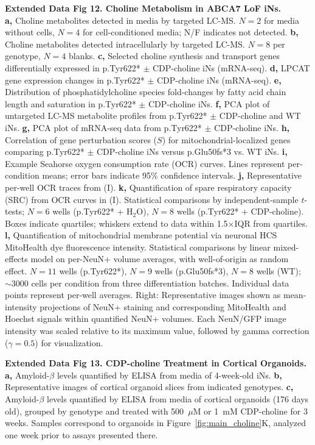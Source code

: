 \textbf{Extended Data Fig 12. Choline Metabolism in ABCA7 LoF iNs.}\\
\textbf{a,} Choline metabolites detected in media by targeted LC-MS. $N=2$ for media without cells, $N=4$ for cell-conditioned media; N/F indicates not detected.
\textbf{b,} Choline metabolites detected intracellularly by targeted LC-MS. $N=8$ per genotype, $N=4$ blanks.
\textbf{c,} Selected choline synthesis and transport genes differentially expressed in p.Tyr622* $\pm$ CDP-choline iNs (mRNA-seq).
\textbf{d,} LPCAT gene expression changes in p.Tyr622* $\pm$ CDP-choline iNs (mRNA-seq).
\textbf{e,} Distribution of phosphatidylcholine species fold-changes by fatty acid chain length and saturation in p.Tyr622* $\pm$ CDP-choline iNs.
\textbf{f,} PCA plot of untargeted LC-MS metabolite profiles from p.Tyr622* $\pm$ CDP-choline and WT iNs.
\textbf{g,} PCA plot of mRNA-seq data from p.Tyr622* $\pm$ CDP-choline iNs.
\textbf{h,} Correlation of gene perturbation scores ($S$) for mitochondrial-localized genes comparing p.Tyr622* $\pm$ CDP-choline iNs versus p.Glu50fs*3 vs. WT iNs.
\textbf{i,} Example Seahorse oxygen consumption rate (OCR) curves. Lines represent per-condition means; error bars indicate 95\% confidence intervals.
\textbf{j,} Representative per-well OCR traces from (I).
\textbf{k,} Quantification of spare respiratory capacity (SRC) from OCR curves in (I). Statistical comparisons by independent-sample $t$-tests; $N=6$ wells (p.Tyr622* + H$_2$O), $N=8$ wells (p.Tyr622* + CDP-choline). Boxes indicate quartiles; whiskers extend to data within 1.5$\times$IQR from quartiles.
\textbf{l,} Quantification of mitochondrial membrane potential via neuronal HCS MitoHealth dye fluorescence intensity. Statistical comparisons by linear mixed-effects model on per-NeuN+ volume averages, with well-of-origin as random effect. $N=11$ wells (p.Tyr622*), $N=9$ wells (p.Glu50fs*3), $N=8$ wells (WT); $\sim3000$ cells per condition from three differentiation batches. Individual data points represent per-well averages. Right: Representative images shown as mean-intensity projections of NeuN+ staining and corresponding MitoHealth and Hoechst signals within quantified NeuN+ volumes. Each NeuN/GFP image intensity was scaled relative to its maximum value, followed by gamma correction ($\gamma = 0.5$) for visualization.

\textbf{Extended Data Fig 13. CDP-choline Treatment in Cortical Organoids.}\\
\textbf{a,} Amyloid-$\beta$ levels quantified by ELISA from media of 4-week-old iNs.
\textbf{b,} Representative images of cortical organoid slices from indicated genotypes.
\textbf{c,} Amyloid-$\beta$ levels quantified by ELISA from media of cortical organoids (176 days old), grouped by genotype and treated with 500~$\mu$M or 1~mM CDP-choline for 3 weeks. Samples correspond to organoids in Figure~\ref{fig:main_choline}K, analyzed one week prior to assays presented there.

